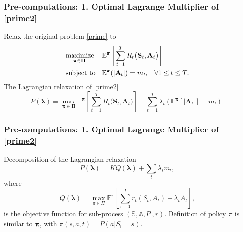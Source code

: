\documentclass{beamer}
\newcommand{\lambdav}{\pmb{\lambda}}
\newcommand{\allp}{\pmb{\pi}}
\newcommand{\allpset}{\mathbf{\Pi}}
\newcommand{\allstater}{\mathbf{S}}
\newcommand{\allar}{\mathbf{A}}
\newcommand{\allr}{R}
\newcommand{\subp}{\pi}
\newcommand{\subpset}{\Pi}
\newcommand{\subr}{r}
\newcommand{\substates}{\mathbb{S}}
\newcommand{\substater}{S}
\newcommand{\substate}{s}
\newcommand{\subactions}{\mathbb{A}}
\newcommand{\subar}{A}
\newcommand{\subpr}{P}
\newcommand{\subaction}{a}
\begin{document}
\begin{frame}
\frametitle{Pre-computations: 1. Optimal Lagrange Multiplier of \eqref{prime2}}
Relax the original problem \eqref{prime} to
\begin{equation}\label{prime2}
\begin{aligned}
& \underset{\allp\in\allpset}{\text{maximize}}
& & \mathbb{E}^{\allp}\left[\sum_{t=1}^{T}\allr_t\big(\allstater_t,\allar_t\big)\right] \\
& \text{subject to}
& & \mathbb{E}^{\allp}(|\allar_t|)=m_t, \hspace{3mm}\forall 1\leq t\leq T .
\end{aligned}
\end{equation}
The Lagrangian relaxation of \eqref{prime2}
\begin{equation}\label{ub}
 P(\lambdav)=\max_{\allp\in \allpset}\mathbb{E}^{\allp}\left[\sum_{t=1}^{T}\allr_t\big(\allstater_t,\allar_t\big)\right]-\sum_{t=1}^T\lambda_t\left(\mathbb{E}^{\allp}[|\allar_t|]-m_t\right).
 \end{equation} 
\end{frame}

\begin{frame}
\frametitle{Pre-computations: 1. Optimal Lagrange Multiplier of \eqref{prime2}}
Decomposition of the Lagrangian relaxation
\begin{equation}\label{dec}
P(\lambdav)=K Q(\lambdav) + \sum_t\lambda_t m_t,
\end{equation}
where
\begin{equation}\label{dpx}
Q(\lambdav)=\max_{\subp\in \subpset}\mathbb{E}^{\subp}\left[\sum_{t=1}^{T}\subr_t(\substater_t,\subar_t)-\lambda_t \subar_t\right],
\end{equation}
is the objective function for sub-process $(\substates,\subactions,\subpr^{\cdot},\subr)$. Definition of policy $\subp$ is similar to $\allp$, with  $\subp(\substate,\subaction,t) = P(\subaction|\substater_t=\substate)$.

\end{frame}
\end{document}
